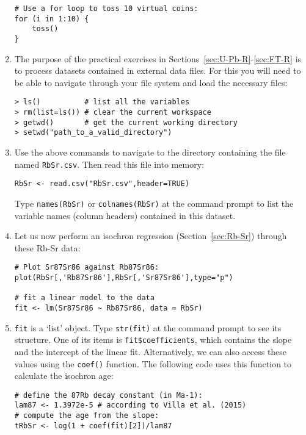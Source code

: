 \begin{enumerate}
\begin{verbatim}
# Use a for loop to toss 10 virtual coins:
for (i in 1:10) {
    toss()
}
\end{verbatim}

\item The purpose of the practical exercises in
  Sections~\ref{sec:U-Pb-R}-\ref{sec:FT-R} is to process datasets
  contained in external data files. For this you will need to be able
  to navigate through your file system and load the necessary files:

\begin{verbatim}
> ls()          # list all the variables
> rm(list=ls()) # clear the current workspace
> getwd()       # get the current working directory
> setwd("path_to_a_valid_directory")
\end{verbatim}

\item Use the above commands to navigate to the directory containing the
file named \texttt{RbSr.csv}. Then read this file into memory:

\begin{verbatim}
RbSr <- read.csv("RbSr.csv",header=TRUE)
\end{verbatim}

Type \texttt{names(RbSr)} or \texttt{colnames(RbSr)} at the command
prompt to list the variable names (column headers) contained in this
dataset.

\item Let us now perform an isochron regression
  (Section~\ref{sec:Rb-Sr}) through these Rb-Sr data: \label{itm:lm}

\begin{verbatim}
# Plot Sr87Sr86 against Rb87Sr86:
plot(RbSr[,'Rb87Sr86'],RbSr[,'Sr87Sr86'],type="p")

# fit a linear model to the data
fit <- lm(Sr87Sr86 ~ Rb87Sr86, data = RbSr)
\end{verbatim}

\item \texttt{fit} is a `list' object. Type \texttt{str(fit)} at the
  command prompt to see its structure. One of its items is
  \verb|fit$coefficients|, which contains the slope and the intercept
  of the linear fit. Alternatively, we can also access these values
  using the \texttt{coef()} function. The following code uses this
  function to calculate the isochron age:

\begin{verbatim}
# define the 87Rb decay constant (in Ma-1):
lam87 <- 1.3972e-5 # according to Villa et al. (2015)
# compute the age from the slope:
tRbSr <- log(1 + coef(fit)[2])/lam87


\end{verbatim}
\end{enumerate}
